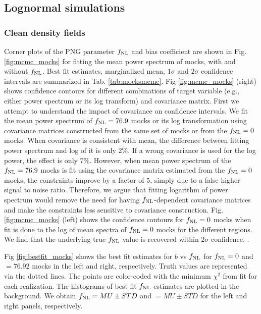 \subsection{Lognormal simulations}

\subsubsection{Clean density fields}
Corner plots of the PNG parameter $f_{\rm NL}$ and bias coefficient are shown in Fig. \ref{fig:mcmc_mocks} for fitting the mean power spectrum of mocks, with and without $f_{\rm NL}$. Best fit estimates, marginalized mean, $1\sigma$ and $2\sigma$ confidence intervals are summarized in Tab. \ref{tab:mocksmcmc}. Fig \ref{fig:mcmc_mocks} (right) shows confidence contours for different combinations of target variable (e.g., either power spectrum or its log transform) and covariance matrix. First we attempt to understand the impact of covariance on confidence intervals. We fit the mean power spectrum of $f_{\rm NL}=76.9$ mocks or its log transformation using covariance matrices constructed from the same set of mocks or from the $f_{\rm NL}=0$ mocks. When covariance is consistent with mean, the difference between fitting power spectrum and log of it is only 2\%. If a wrong covariance is used for the log power, the effect is only $7\%$. However, when mean power spectrum of the $f_{\rm NL}=76.9$ mocks is fit using the covariance matrix estimated from the $f_{\rm NL}=0$ mocks, the constraints improve by a factor of $5$, simply due to a false higher signal to noise ratio. Therefore, we argue that fitting logarithm of power spectrum would remove the need for having $f_{\rm NL}$-dependent covariance matrices and make the constraints less sensitive to covariance construction. Fig. \ref{fig:mcmc_mocks} (left) shows the confidence contours for $f_{\rm NL}=0$ mocks when fit is done to the log of mean spectra of $f_{\rm NL}=0$ mocks for the different regions. We find that the underlying true $f_{\rm NL}$ value is recovered within $2\sigma$ confidence. .

Fig \ref{fig:bestfit_mocks} shows the best fit estimates for $b$ vs $f_{\rm NL}$ for $f_{\rm NL}=0$ and $=76.92$ mocks in the left and right, respectively. Truth values are represented via the dotted lines. The points are color-coded with the minimum $\chi^{2}$ from fit for each realization. The histograms of best fit $f_{\rm NL}$ estimates are plotted in the background. We obtain $f_{\rm NL}=MU\pm STD$ and $=MU\pm STD$ for the left and right panels, respectively.

